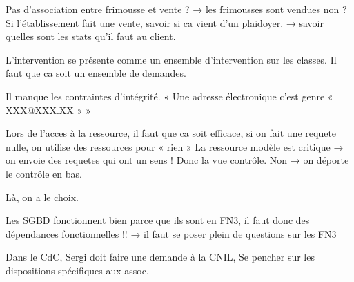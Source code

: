 \documentclass [a4paper] {article}
\begin{document}
Pas d'association entre frimousse et vente ? → les frimousses sont vendues non ?   Si l'établissement fait une vente, savoir si ca vient d'un plaidoyer.               → savoir quelles sont les stats qu'il faut au client.


L'intervention se présente comme un ensemble d'intervention sur les classes.  Il faut que ca soit un ensemble de demandes.

Il manque les contraintes d'intégrité. « Une adresse électronique c'est genre « XXX@XXX.XX » »

Lors de l'acces à la ressource, il faut que ca soit efficace, si on fait une requete nulle, on utilise des ressources pour « rien »
La ressource modèle est critique → on envoie des requetes qui ont un sens ! Donc la vue contrôle.
		Non		  → on déporte le contrôle en bas.

Là, on a le choix.

Les SGBD fonctionnent bien parce que ils sont en FN3, il faut donc des dépendances fonctionnelles !!
→ il faut se poser plein de questions sur les FN3


Dans le CdC, Sergi doit faire une demande à la CNIL,    Se pencher sur les dispositions spécifiques aux assoc.


\newpage
\end{document}
